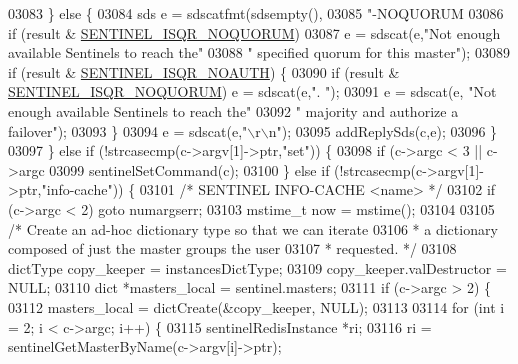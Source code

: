 \begin{DoxyCode}
{{{{{{{{{{{{{{{{{{{{{{{{{{{{{{{{{{{{{{{{{{{{{{{{{{{{{{{{{{{{{03083         \} \textcolor{keywordflow}{else} \{
03084             sds e = sdscatfmt(sdsempty(),
03085                 \textcolor{stringliteral}{"-NOQUORUM %
03086             \textcolor{keywordflow}{if} (result & \hyperlink{sentinel_8c_a671f4068236e7849f994bb2b67c6ea73}{SENTINEL\_ISQR\_NOQUORUM})
03087                 e = sdscat(e,\textcolor{stringliteral}{"Not enough available Sentinels to reach the"}
03088                              \textcolor{stringliteral}{" specified quorum for this master"});
03089             \textcolor{keywordflow}{if} (result & \hyperlink{sentinel_8c_aa0ea85d4d4408c055dbc1e46cea1827a}{SENTINEL\_ISQR\_NOAUTH}) \{
03090                 \textcolor{keywordflow}{if} (result & \hyperlink{sentinel_8c_a671f4068236e7849f994bb2b67c6ea73}{SENTINEL\_ISQR\_NOQUORUM}) e = sdscat(e,\textcolor{stringliteral}{". "});
03091                 e = sdscat(e, \textcolor{stringliteral}{"Not enough available Sentinels to reach the"}
03092                               \textcolor{stringliteral}{" majority and authorize a failover"});
03093             \}
03094             e = sdscat(e,\textcolor{stringliteral}{"\(\backslash\)r\(\backslash\)n"});
03095             addReplySds(c,e);
03096         \}
03097     \} \textcolor{keywordflow}{else} \textcolor{keywordflow}{if} (!strcasecmp(c->argv[1]->ptr,\textcolor{stringliteral}{"set"})) \{
03098         \textcolor{keywordflow}{if} (c->argc < 3 || c->argc %
03099         sentinelSetCommand(c);
03100     \} \textcolor{keywordflow}{else} \textcolor{keywordflow}{if} (!strcasecmp(c->argv[1]->ptr,\textcolor{stringliteral}{"info-cache"})) \{
03101         \textcolor{comment}{/* SENTINEL INFO-CACHE <name> */}
03102         \textcolor{keywordflow}{if} (c->argc < 2) \textcolor{keywordflow}{goto} numargserr;
03103         mstime\_t now = mstime();
03104 
03105         \textcolor{comment}{/* Create an ad-hoc dictionary type so that we can iterate}
03106 \textcolor{comment}{         * a dictionary composed of just the master groups the user}
03107 \textcolor{comment}{         * requested. */}
03108         dictType copy\_keeper = instancesDictType;
03109         copy\_keeper.valDestructor = NULL;
03110         dict *masters\_local = sentinel.masters;
03111         \textcolor{keywordflow}{if} (c->argc > 2) \{
03112             masters\_local = dictCreate(&copy\_keeper, NULL);
03113 
03114             \textcolor{keywordflow}{for} (\textcolor{keywordtype}{int} i = 2; i < c->argc; i++) \{
03115                 sentinelRedisInstance *ri;
03116                 ri = sentinelGetMasterByName(c->argv[i]->ptr);
}}}}}}}}}}}}}}}}}}}}}}}}}}}}}}}}}}}}}}}}}}}}}}}}}}}}}}}}}}}}}}
\end{DoxyCode}
